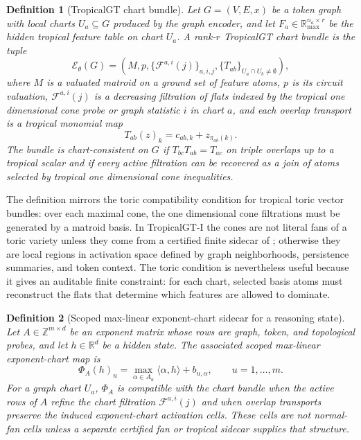\documentclass[11pt]{article}
\newtheorem{definition}{Definition}[section]
\newcommand{\R}{\mathbb{R}}
\newcommand{\Z}{\mathbb{Z}}
\begin{document}
\begin{definition}[TropicalGT chart bundle]
\label{def:tropicalgt-chart-bundle}
Let $G=(V,E,x)$ be a token graph with local charts $U_a\subseteq G$ produced by the graph encoder, and let $F_a\in\R_{\max}^{n_a\times r}$ be the hidden tropical feature table on chart $U_a$.  A rank-$r$ TropicalGT chart bundle is the tuple
\[
  \mathcal{E}_{\theta}(G)=(M,p,\{\mathcal{F}^{a,i}(j)\}_{a,i,j},\{T_{ab}\}_{U_a\cap U_b\neq\emptyset}),
\]
where $M$ is a valuated matroid on a ground set of feature atoms, $p$ is its circuit valuation, $\mathcal{F}^{a,i}(j)$ is a decreasing filtration of flats indexed by the tropical one dimensional cone probe or graph statistic $i$ in chart $a$, and each overlap transport is a tropical monomial map
\[
  T_{ab}(z)_k = c_{ab,k}+z_{\pi_{ab}(k)}.
\]
The bundle is chart-consistent on $G$ if $T_{bc}T_{ab}=T_{ac}$ on triple overlaps up to a tropical scalar and if every active filtration can be recovered as a join of atoms selected by tropical one dimensional cone inequalities.
\end{definition}

The definition mirrors the toric compatibility condition for tropical toric vector bundles: over each maximal cone, the one dimensional cone filtrations must be generated by a matroid basis.  In TropicalGT-I the cones are not literal fans of a toric variety unless they come from a certified finite sidecar of ; otherwise they are local regions in activation space defined by graph neighborhoods, persistence summaries, and token context.  The toric condition is nevertheless useful because it gives an auditable finite constraint: for each chart, selected basis atoms must reconstruct the flats that determine which features are allowed to dominate.

\begin{definition}[Scoped max-linear exponent-chart sidecar for a reasoning state]
\label{def:tropicalgt-toric-embedding}
Let $A\in\Z^{m\times d}$ be an exponent matrix whose rows are graph, token, and topological probes, and let $h\in\R^d$ be a hidden state.  The associated scoped max-linear exponent-chart map is
\[
  \Phi_A(h)_u = \max_{\alpha\in A_u}\langle \alpha,h\rangle + b_{u,\alpha},\qquad u=1,\ldots,m.
\]
For a graph chart $U_a$, $\Phi_A$ is compatible with the chart bundle when the active rows of $A$ refine the chart filtration $\mathcal{F}^{a,i}(j)$ and when overlap transports preserve the induced exponent-chart activation cells.  These cells are not normal-fan cells unless a separate certified fan or tropical sidecar supplies that structure.
\end{definition}
\end{document}
